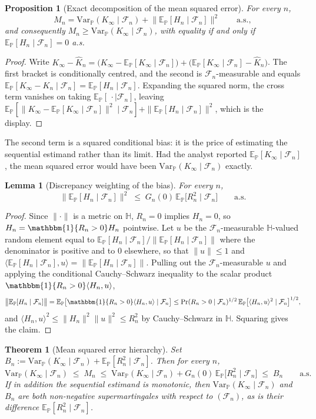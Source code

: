 \documentclass{article}
\newcommand{\Var}{\mathrm{Var}_{\mathbb{P}}}
\newcommand{\E}{\mathbb{E}_{\mathbb{P}}}
\newcommand{\F}{\mathcal{F}}
\newcommand{\1}{\mathbbm{1}}
\newtheorem{prop}{Proposition}
\newtheorem{theorem}{Theorem}
\newtheorem{lemma}{Lemma}
\begin{document}
\begin{prop}[Exact decomposition of the mean squared error]
\label{msedecomp}
For every $n$,
\[
M_n=\Var(K_\infty\mid\F_n)+\big\|\E[H_n\mid\F_n]\big\|^2
\qquad\text{a.s.},
\]
and consequently $M_n\ge\Var(K_\infty\mid\F_n)$, with equality if and only if
$\E[H_n\mid\F_n]=0$ a.s.
\end{prop}

\begin{proof}
Write
$K_\infty-\widehat K_n=\big(K_\infty-\E[K_\infty\mid\F_n]\big)+\big(\E[K_\infty\mid\F_n]-\widehat K_n\big)$.
The first bracket is conditionally centred, and the second is $\F_n$-measurable and equals
$\E[K_\infty-K_n\mid\F_n]=\E[H_n\mid\F_n]$. Expanding the squared norm, the cross term vanishes on
taking $\E[\,\cdot\mid\F_n]$, leaving
$\E[\|K_\infty-\E[K_\infty\mid\F_n]\|^2\mid\F_n]+\|\E[H_n\mid\F_n]\|^2$, which is the display.
\end{proof}

The second term is a squared conditional bias: it is the price of estimating the sequential
estimand rather than its limit. Had the analyst reported $\E[K_\infty\mid\F_n]$, the mean squared
error would have been $\Var(K_\infty\mid\F_n)$ exactly.

\begin{lemma}[Discrepancy weighting of the bias]
\label{biasweight}
For every $n$,
\[
\big\|\E[H_n\mid\F_n]\big\|^2\;\le\;G_n(0)\,\E\big[R_n^2\mid\F_n\big]\qquad\text{a.s.}
\]
\end{lemma}

\begin{proof}
Since $\|\cdot\|$ is a metric on $\mathbb{H}$, $R_n=0$ implies $H_n=0$, so
$H_n=\1\{R_n>0\}H_n$ pointwise. Let $u$ be the $\F_n$-measurable $\mathbb{H}$-valued random element
equal to $\E[H_n\mid\F_n]/\|\E[H_n\mid\F_n]\|$ where the denominator is positive and to $0$
elsewhere, so that $\|u\|\le1$ and
$\langle\E[H_n\mid\F_n],u\rangle=\|\E[H_n\mid\F_n]\|$. Pulling out the
$\F_n$-measurable $u$ and applying the
conditional Cauchy--Schwarz inequality to the scalar product $\1\{R_n>0\}\langle H_n,u\rangle$,
\[
\big\|\E[H_n\mid\F_n]\big\|
=\E\big[\1\{R_n>0\}\langle H_n,u\rangle\mid\F_n\big]
\le\Pr(R_n>0\mid\F_n)^{1/2}\,\E\big[\langle H_n,u\rangle^2\mid\F_n\big]^{1/2},
\]
and $\langle H_n,u\rangle^2\le\|H_n\|^2\|u\|^2\le R_n^2$ by Cauchy--Schwarz in $\mathbb{H}$. Squaring gives
the claim.
\end{proof}

\begin{theorem}[Mean squared error hierarchy]
\label{msehierarchy}
Set $B_n:=\Var(K_\infty\mid\F_n)+\E[R_n^2\mid\F_n]$. Then for every $n$,
\[
\Var(K_\infty\mid\F_n)\;\le\;M_n\;\le\;\Var(K_\infty\mid\F_n)+G_n(0)\,\E\big[R_n^2\mid\F_n\big]
\;\le\;B_n\qquad\text{a.s.}
\]
If in addition the sequential estimand is monotonic, then $\Var(K_\infty\mid\F_n)$ and $B_n$ are
both non-negative supermartingales with respect to $(\F_n)$, as is their difference
$\E[R_n^2\mid\F_n]$.
\end{theorem}
\end{document}
